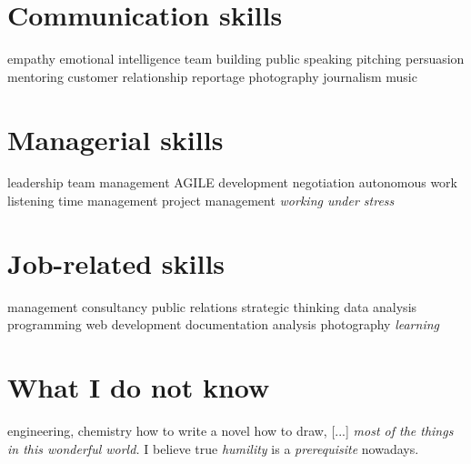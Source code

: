 \documentclass[]{friggeri-cv}
\begin{document}
\begin{aside}
\section{Communication skills}
    empathy
    emotional intelligence
    team building
    public speaking
    pitching
    persuasion
    mentoring
    customer relationship
    reportage
    photography
    journalism
    music
\section{Managerial skills}
    leadership
    team management
    AGILE development
    negotiation
    autonomous work
    listening
    time management
    project management
    \emph{working under stress}
\section{Job-related skills}
    management
    consultancy
    public relations
    strategic thinking
    data analysis
    programming
    web development
    documentation
    analysis
    photography
    \emph{learning}
\section{\color{orange}What I do not know}
    engineering, chemistry
    how to write a novel
    how to draw, [...]
    \emph{most of the things in this wonderful world.}
    \infty
    I believe true \emph{humility} is a \emph{prerequisite} nowadays.
\end{aside}
\end{document}
